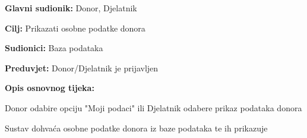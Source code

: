 \noindent {}
					\begin{packed_item}
	
						\item \textbf{Glavni sudionik: }Donor, Djelatnik
						\item \textbf{Cilj:} Prikazati osobne podatke donora
						\item \textbf{Sudionici:} Baza podataka
						\item \textbf{Preduvjet:} Donor/Djelatnik je prijavljen
						\item \textbf{Opis osnovnog tijeka:}
						
						\item[] \begin{packed_enum}
	
							\item Donor odabire opciju "Moji podaci" ili Djelatnik odabere prikaz podataka donora
							\item Sustav dohvaća osobne podatke donora iz baze podataka te ih prikazuje
							
						\end{packed_enum}

					\end{packed_item}
\eject 
\noindent {}
